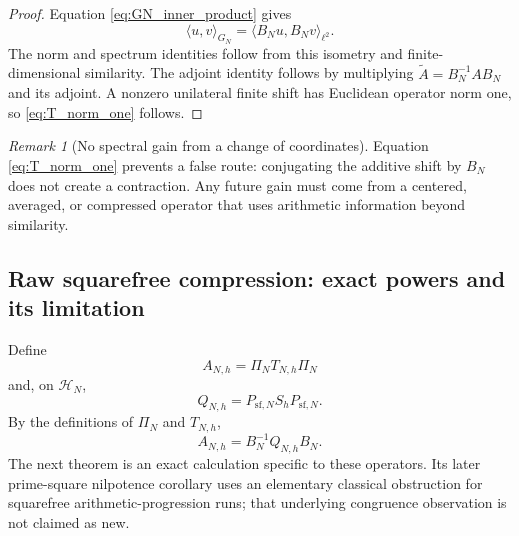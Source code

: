 \documentclass[11pt]{amsart}
\numberwithin{equation}{section}
\theoremstyle{plain}
\theoremstyle{definition}
\theoremstyle{remark}
\newtheorem{remark}[theorem]{Remark}
\begin{document}
\begin{proof}
Equation \eqref{eq:GN_inner_product} gives
\begin{equation}
\langle u,v\rangle_{G_N}=\langle B_Nu,B_Nv\rangle_{\ell^2}.
\label{eq:isometry_identity}
\end{equation}
The norm and spectrum identities follow from this isometry and finite-dimensional similarity.  The adjoint identity follows by multiplying $\widetilde A=B_N^{-1}AB_N$ and its adjoint.  A nonzero unilateral finite shift has Euclidean operator norm one, so \eqref{eq:T_norm_one} follows.
\end{proof}

\begin{remark}[No spectral gain from a change of coordinates]
\label{rem:no_spectral_gain}
Equation \eqref{eq:T_norm_one} prevents a false route: conjugating the additive shift by $B_N$ does not create a contraction.  Any future gain must come from a centered, averaged, or compressed operator that uses arithmetic information beyond similarity.
\end{remark}

\subsection{Raw squarefree compression: exact powers and its limitation}
\label{subsec:raw_squarefree_compression}

Define
\begin{equation}
A_{N,h}=\Pi_NT_{N,h}\Pi_N
\label{eq:raw_squarefree_compression}
\end{equation}
and, on $\mathcal H_N$,
\begin{equation}
Q_{N,h}=P_{\mathrm{sf},N}S_hP_{\mathrm{sf},N}.
\label{eq:Q_raw_compression}
\end{equation}
By the definitions of $\Pi_N$ and $T_{N,h}$,
\begin{equation}
A_{N,h}=B_N^{-1}Q_{N,h}B_N.
\label{eq:A_Q_similarity}
\end{equation}
The next theorem is an exact calculation specific to these operators.  Its later prime-square nilpotence corollary uses an elementary classical obstruction for squarefree arithmetic-progression runs; that underlying congruence observation is not claimed as new.
\end{document}
